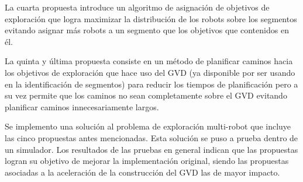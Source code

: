 La cuarta propuesta introduce un algoritmo de asignación de objetivos de exploración
que logra maximizar la distribución de los robots sobre los segmentos evitando
asignar más robots a un segmento que los objetivos que contenidos en él.

La quinta y última propuesta consiste en un método de planificar caminos hacia
los objetivos de exploración que hace uso del GVD (ya disponible por ser usando
en la identificación de segmentos) para reducir los tiempos de planificación
pero a su vez permite que los caminos no sean completamente sobre el GVD evitando
planificar caminos innecesariamente largos.

Se implemento una solución al problema de exploración multi-robot que incluye
las cinco propuestas antes mencionadas. Esta solución se puso a prueba dentro de un
simulador. Los resultados de las pruebas en general indican que las propuestas
logran su objetivo de mejorar la implementación original, siendo las propuestas
asociadas a la aceleración de la construcción del GVD las de mayor impacto.

